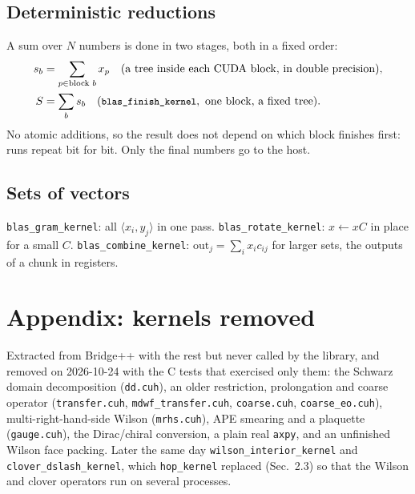 \documentclass[11pt,a4paper]{article}
\numberwithin{equation}{section}
\newcommand{\code}[1]{\texttt{\small #1}}
\begin{document}
\subsection{Deterministic reductions}

A sum over $N$ numbers is done in two stages, both in a fixed order:
\begin{align}
s_b &= \sum_{p\in\text{block }b}x_p\quad(\text{a tree inside each CUDA block, in double precision}),\\
S &= \sum_b s_b\quad(\code{blas\_finish\_kernel},\ \text{one block, a fixed tree}).
\end{align}
No atomic additions, so the result does not depend on which block finishes first: runs repeat bit
for bit. Only the final numbers go to the host.

\subsection{Sets of vectors}

\code{blas\_gram\_kernel}: all $\langle x_i,y_j\rangle$ in one pass. \code{blas\_rotate\_kernel}:
$x\leftarrow xC$ in place for a small $C$. \code{blas\_combine\_kernel}: $\text{out}_j=\sum_i x_ic_{ij}$
for larger sets, the outputs of a chunk in registers.

\section*{Appendix: kernels removed}

Extracted from Bridge++ with the rest but never called by the library, and removed on 2026-10-24
with the C tests that exercised only them: the Schwarz domain decomposition (\code{dd.cuh}), an
older restriction, prolongation and coarse operator (\code{transfer.cuh}, \code{mdwf\_transfer.cuh},
\code{coarse.cuh}, \code{coarse\_eo.cuh}), multi-right-hand-side Wilson (\code{mrhs.cuh}), APE smearing
and a plaquette (\code{gauge.cuh}), the Dirac/chiral conversion, a plain real \code{axpy}, and an
unfinished Wilson face packing. Later the same day \code{wilson\_interior\_kernel} and
\code{clover\_dslash\_kernel}, which \code{hop\_kernel} replaced (Sec.~2.3) so that the Wilson and
clover operators run on several processes.
\end{document}
